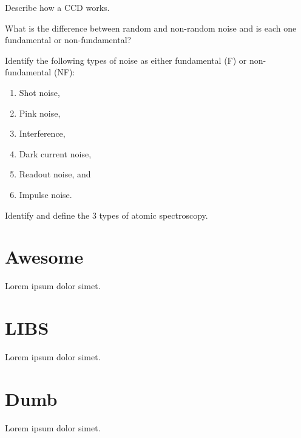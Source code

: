 \documentclass{hw}
\begin{document}
\solution



\problem{}

Describe how a CCD works.

\solution



\problem{}

What is the difference between random and non-random noise and is each one fundamental or non-fundamental?

\solution



\problem{}

Identify the following types of noise as either fundamental (F) or non-fundamental (NF):
\begin{enumerate}
    \item Shot noise,
    \item Pink noise,
    \item Interference,
    \item Dark current noise,
    \item Readout noise, and
    \item Impulse noise.
\end{enumerate}

\solution



\problem{}

Identify and define the 3 types of atomic spectroscopy.

\solution

\part{Awesome}
Lorem ipsum dolor simet.

\part{LIBS}
Lorem ipsum dolor simet.

\part{Dumb}
Lorem ipsum dolor simet.
\end{document}
